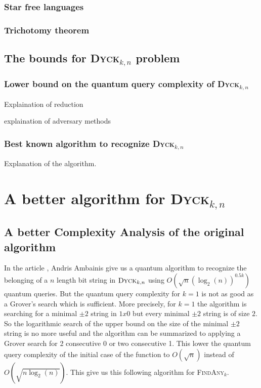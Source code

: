 \documentclass[11pt,a4paper]{article}
\newcommand{\Dyck}[1]{\textsc{Dyck$_{#1}$}}
\newcommand{\FA}[1]{\textsc{FindAny$_{#1}$}}
\theoremstyle{definition}
\theoremstyle{plain}
\theoremstyle{definition}
\begin{document}
\subsubsection{Star free languages}\label{ssec:starfree}

\subsubsection{Trichotomy theorem}



\subsection{The bounds for \Dyck{k,n} problem}

\subsubsection{Lower bound on the quantum query complexity of \Dyck{k, n}}

Explaination of reduction

explaination of adversary methods


\subsubsection{Best known algorithm to recognize \Dyck{k, n}}

Explanation of the algorithm.

\section{A better algorithm for \Dyck{k,n}}

\subsection{A better Complexity Analysis of the original algorithm}

In the article \cite{art:2DGrid}, Andris Ambainis give us a quantum algorithm to recognize
the belonging of a $n$ length bit string in $\Dyck{k, n}$ using
$O(\sqrt{n}(\log_2(n))^{0.5k})$ quantum queries. But the quantum query complexity for $k=1$ is not as good as a
Grover's search which is sufficient. More precisely, for $k=1$ the algorithm is
searching for a minimal $\pm 2$ string in $1x0$ but every minimal $\pm 2$ string
is of size $2$. So the logarithmic search of the upper bound on the size of the
minimal $\pm 2$ string is no more useful and the algorithm can be summarized to
applying a Grover search for 2 consecutive 0 or two consecutive 1. This lower the quantum
query complexity of the initial case of the function to $O(\sqrt{n})$ instead of $O(\sqrt{n\log_2(n)})$.
This give us this following algorithm for \FA{k}.
\end{document}
